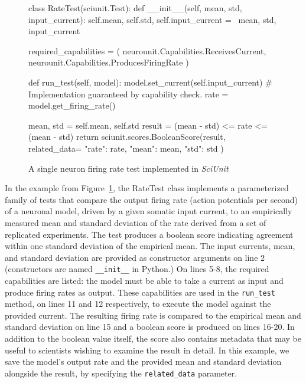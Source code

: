 \documentclass[11pt,letterpaper]{article}
\begin{document}
\begin{figure}
\caption{A single neuron firing rate test implemented in \textit{SciUnit}}
\label{fig:rate_test}
\begin{python}
class RateTest(sciunit.Test):
	def __init__(self, mean, std, input_current):
		self.mean, self.std, self.input_current = \
		mean, std, input_current
	
	required_capabilities = (
		neurounit.Capabilities.ReceivesCurrent,
		neurounit.Capabilities.ProducesFiringRate
	)
	
	def run_test(self, model):
		model.set_current(self.input_current) 
		# Implementation guaranteed by capability check.  
		rate = model.get_firing_rate()
		
		mean, std = self.mean, self.std
		result = (mean - std) <= rate <= (mean - std)
		return sciunit.scores.BooleanScore(result, related_data={
			"rate": rate,
			"mean": mean,
			"std": std
		})
\end{python}
\vspace{-18px}
\end{figure}

In the example from Figure~\ref{fig:rate_test}, the RateTest class implements a parameterized family of tests that compare the output firing rate (action potentials per second) of a neuronal model, driven by a given somatic input current, to an empirically measured mean and standard deviation of the rate derived from a set of replicated experiments. The test produces a boolean score indicating agreement within one standard deviation of the empirical mean. The input currents, mean, and standard deviation are provided as constructor arguments on line 2 (constructors are named \verb|__init__| in Python.) On lines 5-8, the required capabilities are listed: the model must be able to take a current as input and produce firing rates as output. These capabilities are used in the \verb|run_test| method, on lines 11 and 12 respectively, to execute the model against the provided current. The resulting firing rate is compared to the empirical mean and standard deviation on line 15 and a boolean score is produced on lines 16-20. In addition to the boolean value itself, the score also contains metadata that may be useful to scientists wishing to examine the result in detail. In this example, we save the model's output rate and the provided mean and standard deviation alongside the result, by specifying the \verb|related_data| parameter.  
\end{document}
